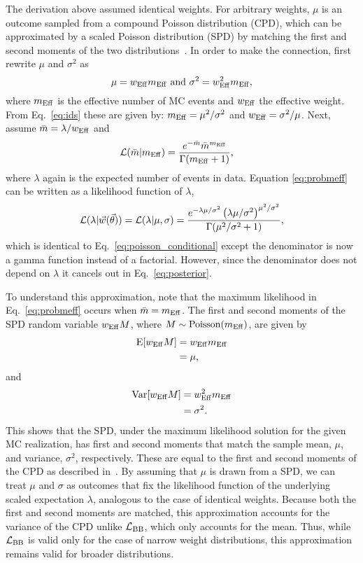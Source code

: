The derivation above assumed identical weights.
For arbitrary weights, $\mu$ is an outcome sampled from a compound Poisson distribution (CPD), which can be approximated by a scaled Poisson distribution (SPD) by matching the first and second moments of the two distributions~\cite{Bohm:2013gla}.
In order to make the connection, first rewrite $\mu$ and $\sigma^2$ as
\begin{equation}\label{eq:effparameters}
\mu= w_\mathrm{Eff} m_\mathrm{Eff}~\textmd{and}~\sigma^2 = w_\mathrm{Eff}^2 m_\mathrm{Eff},
\end{equation}
where $m_\mathrm{Eff}$ is the effective number of MC events and $w_\mathrm{Eff}$ the effective weight.
From Eq.~\eqref{eq:ids} these are given by: $m_\mathrm{Eff} = \mu^2/\sigma^2$ and $w_\mathrm{Eff}=\sigma^2/\mu$.
Next, assume $\bar m = \lambda/w_\mathrm{Eff}$ and
\begin{align}
\label{eq:probmeff}
\mathcal{L}(\bar m|m_\mathrm{Eff})&= \frac{e^{-\bar m}{\bar m}^{m_\mathrm{Eff}}}{\Gamma(m_\mathrm{Eff}+1)},
\end{align}
where $\lambda$ again is the expected number of events in data.
Equation \eqref{eq:probmeff} can be written as a likelihood function of $\lambda$,
\begin{equation}
\mathcal{L}(\lambda|\vec{w}(\vec{\theta}))=\mathcal{L}(\lambda|\mu, \sigma)=\frac{e^{-\lambda\mu/\sigma^2}\left(\lambda\mu/\sigma^2\right)^{\mu^2/\sigma^2}}{\Gamma(\mu^2/\sigma^2+1)},
\label{eq:poisson_conditional_arb}
\end{equation}
which is identical to Eq.~\eqref{eq:poisson_conditional} except the denominator is now a gamma function instead of a factorial.
However, since the denominator does not depend on $\lambda$ it cancels out in Eq.~\eqref{eq:posterior}.

To understand this approximation, note that the maximum likelihood in Eq.~\eqref{eq:probmeff} occurs when $\bar m = m_\mathrm{Eff}$.
The first and second moments of the SPD random variable $w_\mathrm{Eff} M$, where $M \sim \mathrm{Poisson}(m_\mathrm{Eff})$, are given by
\begin{align}
\mathrm{E}[w_\mathrm{Eff} M] &= w_\mathrm{Eff} m_\mathrm{Eff} \\
&= \mu, \nonumber
\end{align}
and
\begin{align}
\mathrm{Var}[w_\mathrm{Eff} M] &= w_\mathrm{Eff}^2 m_\mathrm{Eff} \\
&= \sigma^2. \nonumber
\end{align}
This shows that the SPD, under the maximum likelihood solution for the given MC realization, has first and second moments that match the sample mean, $\mu$, and variance, $\sigma^2$, respectively.
These are equal to the first and second moments of the CPD as described in~\cite{Bohm:2013gla}.
By assuming that $\mu$ is drawn from a SPD, we can treat $\mu$ and $\sigma$ as outcomes that fix the likelihood function of the underlying scaled expectation $\lambda$, analogous to the case of identical weights.
Because both the first and second moments are matched, this approximation accounts for the variance of the CPD unlike $\mathcal{L}_{\textmd{BB}}$, which only accounts for the mean.
Thus, while $\mathcal{L}_{\textmd{BB}}$ is valid only for the case of narrow weight distributions, this approximation remains valid for broader distributions.
